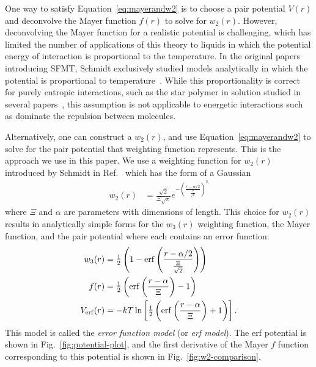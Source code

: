 \documentclass[letterpaper,twocolumn,amsmath,amssymb,prb]{revtex4-1}
\begin{document}
One way to satisfy Equation~\ref{eq:mayerandw2} is to choose a pair potential $V(r)$ and deconvolve the Mayer function $f(r)$ to solve for $w_2(r)$. 
However, deconvolving the Mayer function for a realistic potential is challenging, which has limited the number of applications of this
theory to liquids in which the potential energy of interaction is
proportional to the temperature. 
In the original papers introducing SFMT, Schmidt
exclusively studied models analytically in which the potential is
proportional to temperature~\cite{schmidt1999density,
  schmidt2000fluid}.  While this proportionality is correct for purely
entropic interactions, such as the star polymer in solution studied in
several papers~\cite{schmidt1999density}, this assumption is not
applicable to energetic interactions such as dominate the repulsion
between molecules.

Alternatively, one can 
construct a $w_2(r)$, and use Equation~\ref{eq:mayerandw2} to solve for the pair potential that weighting
function represents.  
This is the approach we use in this paper. We use a weighting function for $w_2(r)$ introduced by Schmidt in Ref.~ which has the form of a Gaussian 
\begin{align}
  w_2(r) &= \frac{\sqrt{2}}{\Xi \sqrt{\pi}} e^{-\left( \frac{r-\alpha/2}{\frac{\Xi}{\sqrt{2}}} \right)^2}
  \label{eq:gaussianw2}
\end{align}
where $\Xi$ and $\alpha$ are parameters with dimensions of length.
This choice for $w_2(r)$ results in analytically simple forms 
for the $w_3(r)$ weighting function, the Mayer function, and the pair
potential where each contains an error function:
\begin{align}
  w_3(r) &= \tfrac12 \left( 1 - \mathrm{erf}\left(\frac{r-\alpha/2}{\frac{\Xi}{\sqrt{2}}}\right) \right) \\
  f(r) &= \tfrac12 \left( \mathrm{erf}\left( \frac{r - \alpha}{\Xi} \right) - 1 \right)
  \label{eq:mayer-approx} \\
  V_{\mathrm{erf}}(r) &= -kT\ln\left[\tfrac12 \left( \mathrm{erf}\left( \frac{r -
    \alpha}{\Xi} \right) + 1 \right) \right].\label{eq:Verf}
\end{align}
This model is called the \emph{error function model} (or \emph{erf model}). The erf potential is shown in Fig.~\ref{fig:potential-plot}, and the
first derivative of the Mayer $f$ function corresponding to this
potential is shown in Fig.~\ref{fig:w2-comparison}.  
\end{document}
